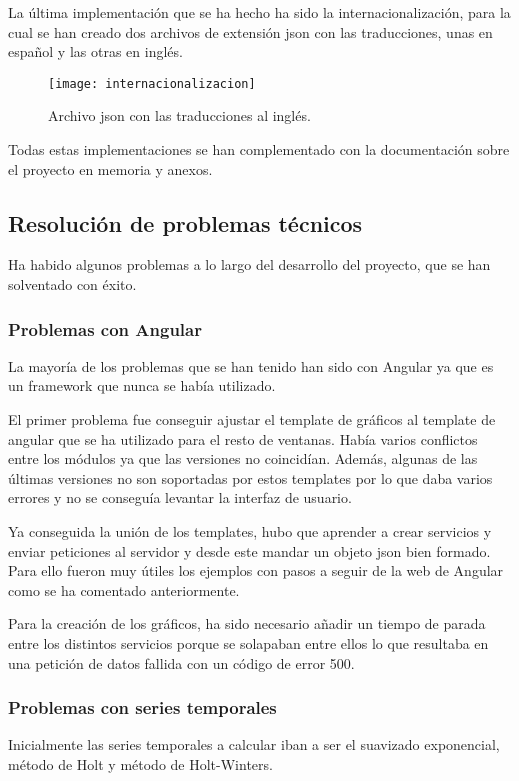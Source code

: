 
La última implementación que se ha hecho ha sido la internacionalización, para la cual se han creado dos archivos de extensión json con las traducciones, unas en español y las otras en inglés.
\begin{figure}[h]
    \centering
    \texttt{[image: internacionalizacion]}
    \caption{Archivo json con las traducciones al inglés.}
    \label{fig:my_label}
\end{figure}

Todas estas implementaciones se han complementado con la documentación sobre el proyecto en memoria y anexos.

\subsection{Resolución de problemas técnicos}
Ha habido algunos problemas a lo largo del desarrollo del proyecto, que se han solventado con éxito.

\subsubsection{Problemas con Angular}

La mayoría de los problemas que se han tenido han sido con Angular ya que es un framework que nunca se había utilizado.

El primer problema fue conseguir ajustar el template de gráficos al template de angular que se ha utilizado para el resto de ventanas. 
Había varios conflictos entre los módulos ya que las versiones no coincidían. Además, algunas de las últimas versiones no son soportadas por estos templates por lo que daba varios errores y no se conseguía levantar la interfaz de usuario.

Ya conseguida la unión de los templates, hubo que aprender a crear servicios y enviar peticiones al servidor y desde este mandar un objeto json bien formado.
Para ello fueron muy útiles los ejemplos con pasos a seguir de la web de Angular como se ha comentado anteriormente.

Para la creación de los gráficos, ha sido necesario añadir un tiempo de parada entre los distintos servicios porque se solapaban entre ellos lo que resultaba en una petición de datos fallida con un código de error 500.

\subsubsection{Problemas con series temporales}
Inicialmente las series temporales a calcular iban a ser el suavizado exponencial, método de Holt y método de Holt-Winters.


